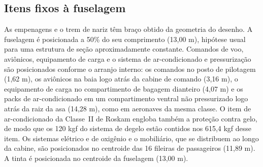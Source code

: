 \subsection{Itens fixos à fuselagem}

As empenagens e o trem de nariz têm braço obtido da geometria do desenho. A fuselagem é posicionada a 50\% do seu comprimento (13,00 m), hipótese usual para uma estrutura de seção aproximadamente constante. Comandos de voo, aviônicos, equipamento de carga e o sistema de ar-condicionado e pressurização são posicionados conforme o arranjo interno: os comandos no posto de pilotagem (1,62 m), os aviônicos na baia logo atrás da cabine de comando (3,16 m), o equipamento de carga no compartimento de bagagem dianteiro (4,07 m) e os packs de ar-condicionado em um compartimento ventral não pressurizado logo atrás da raiz da asa (14,28 m), como em aeronaves da mesma classe. O item de ar-condicionado da Classe~II de Roskam engloba também a proteção contra gelo, de modo que os 120 kgf do sistema de degelo estão contidos nos 615,4 kgf desse item. Os sistemas elétrico e de oxigênio e o mobiliário, que se distribuem ao longo da cabine, são posicionados no centroide das 16 fileiras de passageiros (11,89 m). A tinta é posicionada no centroide da fuselagem (13,00 m).

